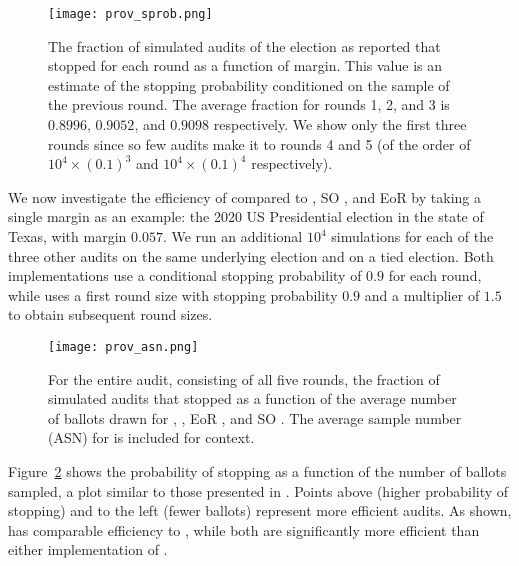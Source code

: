 \begin{figure}[h!]
\texttt{[image: prov\_sprob.png]}
\caption{The fraction of simulated \Providence audits of the election as reported that stopped for each round as a function of margin. This value is an estimate of the stopping probability conditioned on the sample of the previous round. The average fraction for rounds 1, 2, and 3 is $0.8996$, $0.9052$, and $0.9098$ respectively. We show only the first three rounds since so few audits make it to rounds 4 and 5 (of the order of $10^4 \times (0.1)^3$ and $10^4 \times (0.1)^4$ respectively).}
\label{fig:prov-sprob}
\end{figure}

We now investigate the efficiency of \Providence compared to \Minerva, SO \BRAVO, and EoR \BRAVO by taking a single margin as an example: the 2020 US Presidential election in the state of Texas, with margin $0.057$. We run an additional $10^4$ simulations for each of the three other audits on the same underlying election and on a tied election. Both \BRAVO implementations use a conditional stopping probability of $0.9$ for each round, while \Minerva uses a first round size with stopping probability $0.9$ and a multiplier of $1.5$ to obtain subsequent round sizes. 

\begin{figure}[h!]
\texttt{[image: prov\_asn.png]}
\caption{For the entire audit, consisting of all five rounds, the fraction of simulated audits that stopped as a function of the average number of ballots drawn for \Providence, \Minerva, EoR \BRAVO, and SO \BRAVO. The average sample number (ASN) for \B \BRAVO is included for context.}
\label{fig:prov-asn}
\end{figure}
Figure~\ref{fig:prov-asn} shows the probability of stopping as a function of the number of ballots sampled, a plot similar to those presented in \cite{simulations}. Points above (higher probability of stopping) and to the left (fewer ballots) represent more efficient audits. As shown, \Providence has comparable efficiency to \Minerva, while both are significantly more efficient than either implementation of \BRAVO. 







